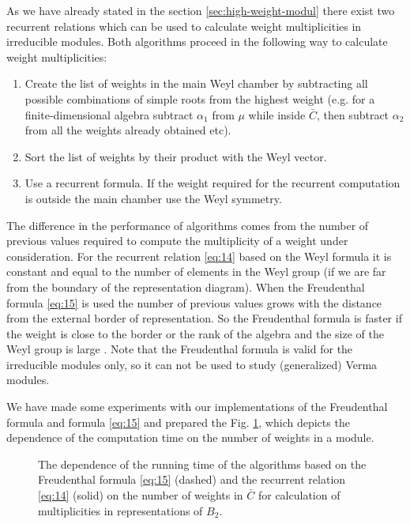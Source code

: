 \documentclass[preprint,12pt]{elsarticle}
\begin{document}
As we have already stated in the section \ref{sec:high-weight-modul} there exist two recurrent relations which can be used to calculate weight multiplicities in irreducible modules. Both algorithms proceed in the following way to calculate weight multiplicities:
\begin{enumerate}
\item Create the list of weights in the main Weyl chamber by subtracting all possible combinations of simple roots from the highest weight (e.g. for a finite-dimensional algebra subtract $\alpha_{1}$ from $\mu$ while inside $\bar C$, then subtract $\alpha_{2}$ from all the weights already obtained etc).
\item Sort the list of weights by their product with the Weyl vector.
\item Use a recurrent formula. If the weight required for the recurrent computation is outside the main chamber use the Weyl symmetry.
\end{enumerate}
The difference in the performance of algorithms comes from the number of previous values required to compute the multiplicity of a weight under consideration. For  the  recurrent relation \eqref{eq:14} based on the Weyl formula it is constant and equal to the number of elements in the Weyl group (if we are far from the boundary of the representation diagram). When the Freudenthal formula \eqref{eq:15} is used the number of previous values grows with the distance from the external border of representation. So the Freudenthal formula is faster if the weight is close to the border or the rank of the algebra and the size of the Weyl group is large \cite{moody1982fast}.
Note that the Freudenthal formula is valid for the irreducible modules only, so it can not be used to study (generalized) Verma modules.

We have made some experiments with our implementations of the Freudenthal formula and formula \eqref{eq:15} and prepared the Fig.  \ref{fig:freudenthal-racah-times}, which depicts the dependence of the computation time on the number of weights in a module.

\begin{figure}[h]
  \noindent{}
  \caption{The dependence of the running time of the algorithms based on the Freudenthal formula \eqref{eq:15} (dashed) and the recurrent relation \eqref{eq:14} (solid) on the number of weights in $\bar C$ for calculation of multiplicities in representations of $B_{2}$.}
\label{fig:freudenthal-racah-times}

\end{figure}
\end{document}
